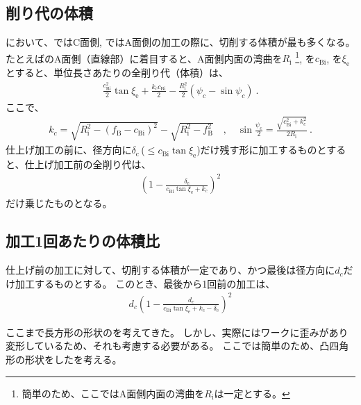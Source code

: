 \subsection{削り代の体積}
\EndFaceChamferMilling において、\EndFaceOutChamferMilling ではC面側, \EndFaceInChamferMilling ではA面側の加工の際に、切削する体積が最も多くなる。
たとえば\BottomEndFaceInCChamfer のA面側（直線部）に着目すると、A面側内面の湾曲を$R_\mathrm i$%
\footnote{簡単のため、ここではA面側内面の湾曲を$R_\mathrm i$は一定とする。},
\EndFaceInCChamferLength を$c_\mathrm{Bi}$, \EndFaceInCChamferAngle を$\xi_\mathrm e$とすると、単位長さあたりの全削り代（体積）は、
\begin{align*}
  \frac{c_\mathrm{Bi}^2}2\tan\xi_\mathrm e
  +\frac{k_cc_\mathrm{Bi}}2
  -\frac{R_\mathrm i^2}2(\psi_c-\sin\psi_c)\ .
\end{align*}
ここで、
\begin{align*}
  k_c = \sqrt{R_\mathrm i^2-(f_\mathrm B-c_\mathrm{Bi})^2}
        -\sqrt{R_\mathrm i^2-f_\mathrm B^2}\quad, \quad
  \sin\frac{\psi_c}2 = \frac{\sqrt{c_\mathrm{Bi}^2+k_c^2}}{2R_\mathrm i}\ .
\end{align*}
仕上げ加工の前に、径方向に$\delta_\mathrm c$\,($\leq c_\mathrm{Bi}\tan\xi_\mathrm e$)だけ残す形に加工するものとすると、仕上げ加工前の全削り代は、
\begin{align*}
  \left(1-\frac{\delta_\mathrm e}{c_\mathrm{Bi}\tan\xi_\mathrm e+k_c}\right)^2
\end{align*}
だけ乗じたものとなる。


\subsection{加工1回あたりの体積比}
仕上げ前の加工に対して、切削する体積が一定であり、かつ最後は径方向に$d_c$だけ加工するものとする。
このとき、最後から1回前の加工は、
\begin{align*}
  d_c\left(1-\frac{d_c}{c_\mathrm{Bi}\tan\xi_\mathrm e+k_c-\delta_\mathrm e}\right)^2
\end{align*}



\clearpage
ここまで長方形の形状の\EndFaceCChamferMilling を考えてきた。
しかし、実際にはワークに歪みがあり変形しているため、それも考慮する必要がある。
ここでは簡単のため、凸四角形の形状をした\EndFaceCChamferMilling を考える。


